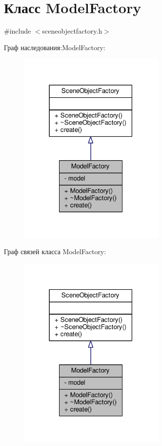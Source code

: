 \hypertarget{class_model_factory}{}\section{Класс Model\+Factory}
\label{class_model_factory}


{\ttfamily \#include $<$sceneobjectfactory.\+h$>$}



Граф наследования\+:Model\+Factory\+:
\nopagebreak
\begin{figure}[H]
\begin{center}
\leavevmode
\includegraphics[width=207pt]{d9/d14/class_model_factory__inherit__graph}
\end{center}
\end{figure}


Граф связей класса Model\+Factory\+:
\nopagebreak
\begin{figure}[H]
\begin{center}
\leavevmode
\includegraphics[width=207pt]{de/dae/class_model_factory__coll__graph}
\end{center}
\end{figure}
